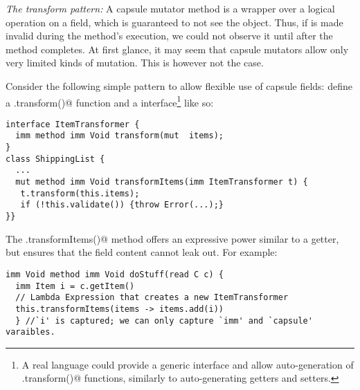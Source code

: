 \loseSpace
\noindent\textit{The transform pattern:}
A capsule mutator method is a wrapper over a logical operation on a field, which is guaranteed to not see the \Q@this@ object.
Thus, if \Q@this@ is made invalid during 
the method's execution, we could not observe it until after the method completes.
At first glance, it may seem that capsule mutators allow only very limited kinds of mutation.
This is however not the case. 

Consider the following
simple pattern to allow flexible use of capsule fields: define a \Q@.transform()@ function and a \Q@ItemTransformer@ interface\footnote{A real language could
provide a generic \Q@Transformer@ interface and allow auto-generation of  \Q@.transform()@ functions, similarly to auto-generating getters and setters.} like so:


%
%
%
%
%
%
%

\saveSpace
\begin{lstlisting}
interface ItemTransformer { 
  imm method imm Void transform(mut  items);
}
class ShippingList {
  ...
  mut method imm Void transformItems(imm ItemTransformer t) {
   t.transform(this.items);
   if (!this.validate()) {throw Error(...);}
}}
\end{lstlisting}
The \Q@.transformItems()@ method 
offers an expressive power similar to a
\Q@mut@ getter, but ensures that 
the field content cannot leak out.
For example:
\begin{lstlisting}[escapechar=\%]
imm Void method imm Void doStuff(read C c) {
  imm Item i = c.getItem()
  // Lambda Expression that creates a new ItemTransformer
  this.transformItems(items -> items.add(i))
  } //`i' is captured; we can only capture `imm' and `capsule' varaibles.
\end{lstlisting}

